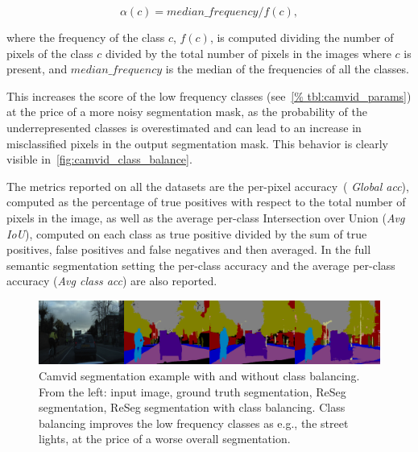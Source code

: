 \begin{equation*}
    \alpha(c) = median\_frequency / f(c),
\end{equation*}

\noindent where the frequency of the class $c$, $f(c)$, is computed dividing
the number of pixels of the class $c$ divided by the total number of pixels in
the images where $c$ is present, and $median\_frequency$ is the median of the
frequencies of all the classes.

This increases the score of the low frequency classes (see~\autoref{%
tbl:camvid_params}) at the price of a more noisy segmentation mask, as the
probability of the underrepresented classes is overestimated and can lead to
an increase in misclassified pixels in the output segmentation mask. This
behavior is clearly visible in~\autoref{fig:camvid_class_balance}.

The metrics reported on all the datasets are the per-pixel accuracy~(\emph{%
Global acc}), computed as the percentage of true positives with respect to the
total number of pixels in the image, as well as the average per-class
Intersection over Union (\emph{Avg IoU}), computed on each class as true
positive divided by the sum of true positives, false positives and false
negatives and then averaged. In the full semantic segmentation setting the
per-class accuracy and the average per-class accuracy (\emph{Avg class acc})
are also reported.

\begin{figure}[t]
    \centering
    \includegraphics[width=\textwidth]{img/reseg/samples/camvid_classbal_diff.png}
    \caption{Camvid segmentation example with and without class balancing. From
        the left: input image, ground truth segmentation, ReSeg segmentation,
        ReSeg segmentation with class balancing. Class balancing improves the
        low frequency classes as e.g., the street lights, at the price of a
        worse overall segmentation.}
    \label{fig:camvid_class_balance}
\end{figure}

